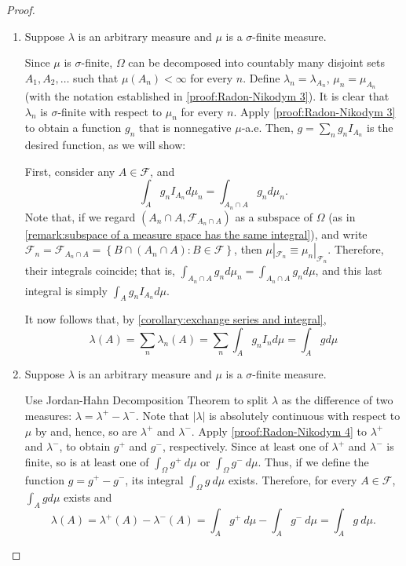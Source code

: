 \begin{proof}
\begin{enumerate}
		
		\item \label{proof:Radon-Nikodym 4} Suppose \(\lambda\) is an arbitrary
measure and \(\mu\) is a \(\sigma\)-finite measure.
		
		Since \(\mu\) is \(\sigma\)-finite, \(\Omega\) can be decomposed into
countably many disjoint sets \(A_{1},A_{2},\dots\) such that
\(\mu(A_{n})<\infty\) for every \(n\). Define \(\lambda_{n}=\lambda_{A_{n}}\),
\(\mu_{n}=\mu_{A_{n}}\) (with the notation established in \ref{proof:Radon-Nikodym 3}). It is clear that \(\lambda_{n}\) is \(\sigma\)-finite with
respect to \(\mu_{n}\) for every \(n\). Apply \ref{proof:Radon-Nikodym 3} to
obtain a function \(g_{n}\) that is nonnegative \(\mu\)-a.e. Then,
\(g=\sum_{n}g_{n}I_{A_{n}}\) is the desired function, as we will show:
		
		First, consider any \(A\in\mathcal{F}\), and
		\[ \int_{A}g_{n}I_{A_{n}}d\mu_{n}=\int_{A_{n}\cap A}g_{n}d\mu_{n}.
		\] Note that, if we regard \(\left(A_{n}\cap A,\mathcal{F}_{A_{n}\cap A}\right)\)
as a subspace of \(\Omega\) (as in \cref{remark:subspace of a measure space has
the same integral}), and write
\(\mathcal{F}_{n}=\mathcal{F}_{A_{n}\cap A}=\left\{B\cap (A_{n}\cap A)\colon B\in\mathcal{F}\right\}\),
then \(\mu|_{\mathcal{F}_{n}}\equiv\mu_{n}|_{\mathcal{F}_{n}}\). Therefore, their integrals
coincide; that is,
\(\int_{A_{n}\cap A}g_{n}d\mu_{n}=\int_{A_{n}\cap A}g_{n}d\mu\),  and this last
integral is simply \(\int_{A}g_{n}I_{A_{n}}d\mu\).
		
		It now follows that, by \cref{corollary:exchange series and integral},
		\[ \lambda(A)=\sum_{n}\lambda_{n}(A)=\sum_{n}\int_{A}g_{n}I_{n}d\mu=\int_{A}gd\mu
		\]
		\item Suppose \(\lambda\) is an arbitrary measure and \(\mu\) is a
\(\sigma\)-finite measure.
		
		Use Jordan-Hahn Decomposition Theorem to split \(\lambda\) as the
difference of two measures: \(\lambda=\lambda^+-\lambda^-\). Note that
\(\left|\lambda\right|\) is absolutely continuous with respect to \(\mu\) by
 and, hence, so are \(\lambda^+\)
and \(\lambda^-\). Apply \ref{proof:Radon-Nikodym 4} to \(\lambda^+\) and
\(\lambda^-\), to obtain \(g^+\) and \(g^-\), respectively. Since at least one
of \(\lambda^+\) and \(\lambda^-\) is finite, so is at least one of
\(\int_{\Omega}g^+~d\mu\) or \(\int_{\Omega}g^-~d\mu\). Thus, if we define the
function \(g=g^+-g^-\), its integral \(\int_{\Omega}g~d\mu\) exists. Therefore,
for every \(A\in\mathcal{F}\), \(\int_{A}gd\mu\) exists and
		\[ \lambda(A)=\lambda^+(A)-\lambda^-(A)=\int_{A}g^+~d\mu-\int_{A}g^-~d\mu=\int_{A}g~d\mu.
		\]
		
	\end{enumerate}
\end{proof}

